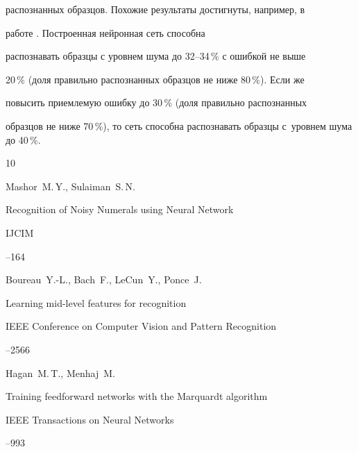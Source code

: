 распознанных образцов. Похожие результаты достигнуты, например, в

работе \cite{afertsev:mashor}. Построенная нейронная сеть способна

распознавать образцы с уровнем шума до 32--34\,\% с ошибкой не выше

20\,\% (доля правильно распознанных образцов не ниже 80\,\%). Если же

повысить приемлемую ошибку до 30\,\% (доля правильно распознанных

образцов не ниже 70\,\%), то сеть способна распознавать образцы с~уровнем шума до 40\,\%.





\pagebreak



\begin{thebibliography}{10}




\by Mashor~M.\,Y., Sulaiman~S.\,N.

\paper Recognition of Noisy Numerals using Neural Network

\jour IJCIM




--164




\by Boureau~Y.-L., Bach~F., LeCun~Y., Ponce~J.

\paper Learning mid-level features for recognition 

\inbook IEEE Conference on Computer Vision and Pattern Recognition


--2566





\by Hagan~M.\,T., Menhaj~M.

\paper Training feedforward networks with the Marquardt algorithm

\jour IEEE Transactions on Neural Networks




--993


\end{thebibliography}
